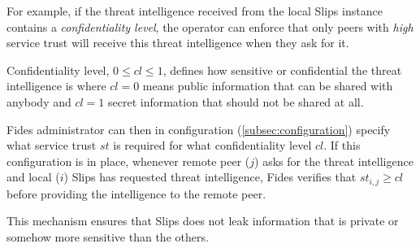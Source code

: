 For example, if the threat intelligence received from the local Slips instance contains a  \textit{confidentiality level}, the operator can enforce that only peers with \textit{high} service trust will receive this threat intelligence when they ask for it.

Confidentiality level, $0 \leq cl \leq 1$, defines how sensitive or confidential the threat intelligence is where $cl = 0$ means public information that can be shared with anybody and $cl = 1$ secret information that should not be shared at all.

Fides administrator can then in configuration (\ref{subsec:configuration}) specify what service trust $st$ is required for what confidentiality level $cl$.
If this configuration is in place, whenever remote peer ($j$) asks for the threat intelligence and local ($i$) Slips has requested threat intelligence, Fides verifies that $st_{i, j} \geq cl$ before providing the intelligence to the remote peer.

This mechanism ensures that Slips does not leak information that is private or somehow more sensitive than the others.